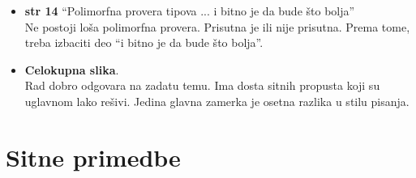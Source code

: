 \documentclass[a4paper]{report}
\begin{document}
\begin{itemize}
\item \textbf{str 14} ``Polimorfna provera tipova ... i bitno je da bude što bolja'' \\ Ne postoji loša polimorfna provera. Prisutna je ili nije prisutna. Prema tome, treba izbaciti deo ``i bitno je da bude što bolja''.
\item \textbf{Celokupna slika}. \\Rad dobro odgovara na zadatu temu. Ima dosta sitnih propusta koji su uglavnom lako rešivi. Jedina glavna zamerka je osetna razlika u stilu pisanja.
\end{itemize}

\section{Sitne primedbe}
\end{document}
